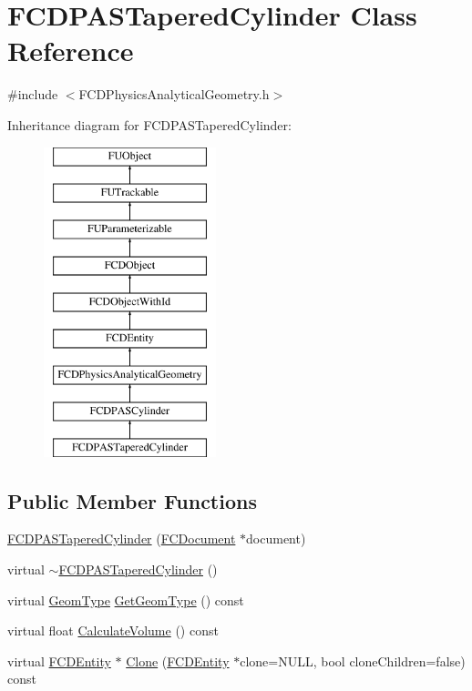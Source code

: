 \hypertarget{classFCDPASTaperedCylinder}{
\section{FCDPASTaperedCylinder Class Reference}
\label{classFCDPASTaperedCylinder}
}


{\ttfamily \#include $<$FCDPhysicsAnalyticalGeometry.h$>$}

Inheritance diagram for FCDPASTaperedCylinder:\begin{figure}[H]
\begin{center}
\leavevmode
\includegraphics[height=9.000000cm]{classFCDPASTaperedCylinder}
\end{center}
\end{figure}
\subsection*{Public Member Functions}
\begin{DoxyCompactItemize}
\item 
\hyperlink{classFCDPASTaperedCylinder_aad8939ae0fd46c84c1f869e6edd450cf}{FCDPASTaperedCylinder} (\hyperlink{classFCDocument}{FCDocument} $\ast$document)
\item 
virtual \hyperlink{classFCDPASTaperedCylinder_afe1df9fc946b28cd7bfcf8c1412f49f9}{$\sim$FCDPASTaperedCylinder} ()
\item 
virtual \hyperlink{classFCDPhysicsAnalyticalGeometry_a511583406e5c6a1bb5bd84c0453a452c}{GeomType} \hyperlink{classFCDPASTaperedCylinder_a0f25b9a117356a6e18e8e29c1c705b4e}{GetGeomType} () const 
\item 
virtual float \hyperlink{classFCDPASTaperedCylinder_a50a96833458500497aa343d1bf3f92e5}{CalculateVolume} () const 
\item 
virtual \hyperlink{classFCDEntity}{FCDEntity} $\ast$ \hyperlink{classFCDPASTaperedCylinder_a34397b0765bebf5dcf08a61585ece3f0}{Clone} (\hyperlink{classFCDEntity}{FCDEntity} $\ast$clone=NULL, bool cloneChildren=false) const 
\end{DoxyCompactItemize}
